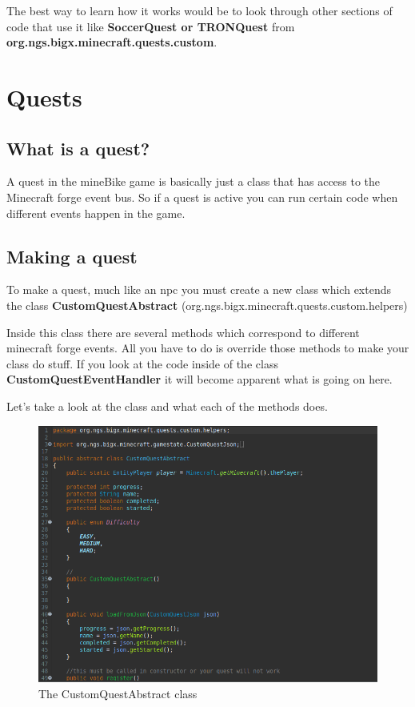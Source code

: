 \documentclass[12pt]{article}
\begin{document}
The best way to learn how it works would be to look through other sections of code that use it like {\bfseries SoccerQuest or TRONQuest} from \\ {\bfseries org.ngs.bigx.minecraft.quests.custom}. 

\section{Quests}
\label{sec:quests}

\subsection{What is a quest?}
A quest in the mineBike game is basically just a class that has access to the Minecraft forge event bus. So if a quest is active you can run certain code when different events happen in the game. 

\subsection{Making a quest}

To make a quest, much like an npc you must create a new class which extends the class {\bfseries CustomQuestAbstract} (org.ngs.bigx.minecraft.quests.custom.helpers)

Inside this class there are several methods which correspond to different minecraft forge events. All you have to do is override those methods to make your class do stuff. If you look at the code inside of the class {\bfseries CustomQuestEventHandler} it will become apparent what is going on here.

Let's take a look at the class and what each of the methods does.

\begin{figure}[H]
	\caption{The CustomQuestAbstract class}
	\includegraphics[scale=0.3]{images/quests/CustomQuestAbstract.png}
	\centering
\end{figure}
\end{document}
